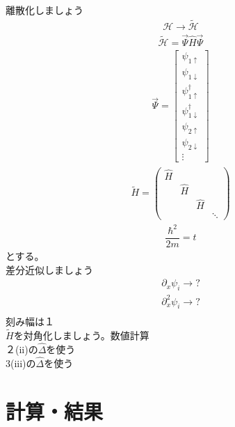 \documentclass{jarticle}
\begin{document}
離散化しましょう\\
\begin{align}
\mathcal{H}\rightarrow \tilde{\mathcal{H}}
\end{align}
\begin{align}
\tilde{\mathcal{H}}=\vec{\Psi}\hat{H}\vec{\Psi}
\end{align}
\begin{align}
\vec{\Psi}=\begin{bmatrix}
\psi_{1\uparrow} \\
\psi_{1\downarrow} \\
\psi_{1\uparrow}^\dagger \\
\psi_{1\downarrow}^\dagger\\
\psi_{2\uparrow} \\
\psi_{2\downarrow} \\
\vdots
\end{bmatrix}
\end{align}
\begin{align}
\tilde{H}=
\begin{pmatrix}
\hat{H} &  &  &  \\
& \hat{H} &  &  \\
&  & \hat{H} &  \\
&  &  & \ddots
\end{pmatrix}
\end{align}
\begin{align}
\dfrac{\hbar^2}{2m}=t
\end{align}
とする。\\
差分近似しましょう\\
\begin{align}
\partial_x \psi_i\rightarrow?\\
\partial^2_x \psi_i\rightarrow?\\
\end{align}
刻み幅は$１$\\
$\tilde{H}$を対角化しましょう。数値計算\\
２(ii)の$\hat{\Delta}$を使う\\
3(iii)の$\hat{\Delta}$を使う\\
\section{計算・結果}
\end{document}

